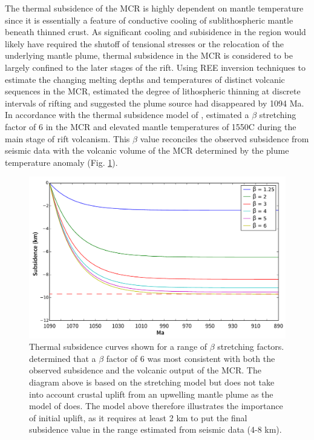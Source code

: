 \documentclass[12pt,letterpaper]{article}
\begin{document}
The thermal subsidence of the MCR is highly dependent on mantle temperature since it is essentially a feature of conductive cooling of sublithospheric mantle beneath thinned crust. As significant cooling and subisidence in the region would likely have required the shutoff of tensional stresses or the relocation of the underlying mantle plume, thermal subsidence in the MCR is considered to be largely confined to the later stages of the rift. Using REE inversion techniques to estimate the changing melting depths and temperatures of distinct volcanic sequences in the MCR, \cite{White1997a} estimated the degree of lithospheric thinning at discrete intervals of rifting and suggested the plume source had disappeared by 1094 Ma. In accordance with the thermal subsidence model of \cite{McKenzie1978a}, \cite{White1997a} estimated a $\beta$ stretching factor of 6 in the MCR and elevated mantle temperatures of 1550\textdegree C during the main stage of rift volcanism. This $\beta$ value reconciles the observed subsidence from seismic data with the volcanic volume of the MCR determined by the plume temperature anomaly (Fig. \ref{fig:therm_sub}).\par

\begin{figure}
\noindent\includegraphics[width=\textwidth]{figures/general_thermal_sub.pdf}
\caption{\footnotesize{Thermal subsidence curves shown for a range of $\beta$ stretching factors. \cite{White1997a} determined that a $\beta$ factor of 6 was most consistent with both the observed subsidence and the volcanic output of the MCR. The diagram above is based on the \cite{McKenzie1978a} stretching model but does not take into account crustal uplift from an upwelling mantle plume as the model of \cite{White1997a} does. The model above therefore illustrates the importance of initial uplift, as it requires at least 2 km to put the final subsidence value in the range estimated from seismic data (4-8 km).}}
\label{fig:therm_sub}
\end{figure}
\end{document}
